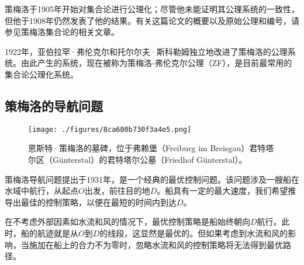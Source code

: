 策梅洛于1905年开始对集合论进行公理化；尽管他未能证明其公理系统的一致性，但他于1908年仍然发表了他的结果。有关这篇论文的概要以及原始公理和编号，请参见策梅洛集合论的相关文章。

1922年，亚伯拉罕·弗伦克尔和托尔尔夫·斯科勒姆独立地改进了策梅洛的公理系统。由此产生的系统，现在被称为策梅洛-弗伦克尔公理（ZF），是目前最常用的集合论公理化系统。
\subsection{策梅洛的导航问题}
\begin{figure}[ht]
\centering
\texttt{[image: ./figures/8ca600b730f3a4e5.png]}
\caption{恩斯特·策梅洛的墓碑，位于弗赖堡（Freiburg im Breisgau）君特塔尔区（Günterstal）的君特塔尔公墓（Friedhof Günterstal）。} \label{fig_Zerme_3}
\end{figure}
策梅洛导航问题提出于1931年，是一个经典的最优控制问题。该问题涉及一艘船在水域中航行，从起点\(O\)出发，前往目的地\(D\)。船具有一定的最大速度，我们希望推导出最佳的控制策略，以便在最短的时间内到达\(D\)。

在不考虑外部因素如水流和风的情况下，最优控制策略是船始终朝向\(D\)航行。此时，船的航迹就是从\(O\)到\(D\)的线段，这显然是最优的。但如果考虑到水流和风的影响，当施加在船上的合力不为零时，忽略水流和风的控制策略将无法得到最优路径。
